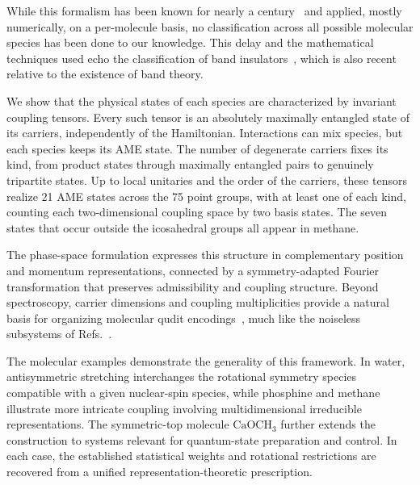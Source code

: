 \documentclass[
  reprint,
  aps,
  prx,
  superscriptaddress,
  amsmath,
  amssymb,
  longbibliography
]{revtex4-2}
\begin{document}
While this formalism has been known for nearly a century~\cite{Wilson1935, Wilson1935b} and applied, mostly numerically, on a per-molecule basis, no classification across all possible molecular species has been done to our knowledge.
This delay and the mathematical techniques used echo the classification of band insulators~\cite{Bradlyn2017, Po2017, Kruthoff2017}, which is also recent relative to the existence of band theory.

We show that the physical states of each species are characterized by invariant coupling tensors. Every such tensor is an absolutely maximally entangled state of its carriers, independently of the Hamiltonian. Interactions can mix species, but each species keeps its AME state. The number of degenerate carriers fixes its kind, from product states through maximally entangled pairs to genuinely tripartite states. Up to local unitaries and the order of the carriers, these tensors realize 21 AME states across the 75 point groups, with at least one of each kind, counting each two-dimensional coupling space by two basis states. The seven states that occur outside the icosahedral groups all appear in methane.



The phase-space formulation expresses this structure in complementary position and momentum representations, connected by a symmetry-adapted Fourier transformation that preserves admissibility and coupling structure. Beyond spectroscopy, carrier dimensions and coupling multiplicities provide a natural basis for organizing molecular qudit encodings~\cite{Sawant2020}, much like the noiseless subsystems of Refs.~\cite{ZanardiRasetti1997, LidarChuangWhaley1998, KnillLaflammeViola2000, LidarWhaley2003}. 

The molecular examples demonstrate the generality of this framework. In water, antisymmetric stretching interchanges the rotational symmetry species compatible with a given nuclear-spin species, while phosphine and methane illustrate more intricate coupling involving multidimensional irreducible representations. The symmetric-top molecule $\mathrm{CaOCH_3}$ further extends the construction to systems relevant for quantum-state preparation and control. In each case, the established statistical weights and rotational restrictions are recovered from a unified representation-theoretic prescription.
\end{document}
